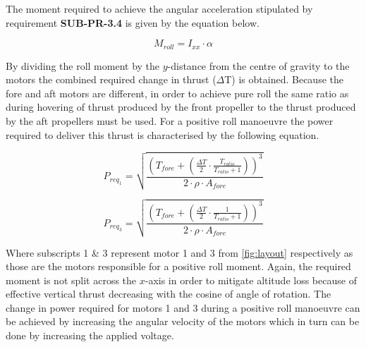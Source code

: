 The moment required to achieve the angular acceleration stipulated by requirement \textbf{SUB-PR-3.4} is given by the equation below.

\begin{equation}
\label{eq:requ_mome_roll}
M_{roll} = I_{xx} \cdot \alpha
\end{equation}


By dividing the roll moment by the $y$-distance from the centre of gravity to the motors the combined required change in thrust ($\Delta$T) is obtained. Because the fore and aft motors are different, in order to achieve pure roll the same ratio as during hovering of thrust produced by the front propeller to the thrust produced by the aft propellers must be used. 
For a positive roll manoeuvre the power required to deliver this thrust is characterised by the following equation.

\begin{minipage}{0.48\textwidth}
    \begin{equation}
        P_{req_{1}} = \sqrt{\frac{(T_{fore}+(\frac{\Delta T}{2} \cdot \frac{T_{ratio}}{T_{ratio} + 1}))^{3}}{2 \cdot \rho \cdot A_{fore}}}
        \label{eq:powe_requ_moto_1_roll}
    \end{equation}
\end{minipage}%
\begin{minipage}{0.48\textwidth}
    \begin{equation}
        P_{req_{3}} = \sqrt{\frac{(T_{fore}+(\frac{\Delta T}{2} \cdot \frac{1}{T_{ratio} + 1}))^{3}}{2 \cdot \rho \cdot A_{fore}}}
        \label{eq:powe_requ_moto_3_roll}
    \end{equation}
\end{minipage}

Where subscripts 1 \& 3 represent motor 1 and 3 from \autoref{fig:layout} respectively as those are the motors responsible for a positive roll moment. Again, the required moment is not split across the $x$-axis in order to mitigate altitude loss because of effective vertical thrust decreasing with the cosine of angle of rotation. The change in power required for motors 1 and 3 during a positive roll manoeuvre can be achieved by increasing the angular velocity of the motors which in turn can be done by increasing the applied voltage. 


